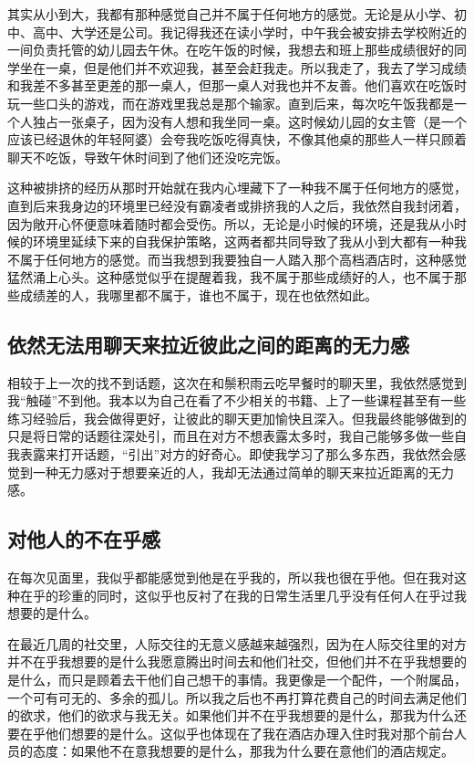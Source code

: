 其实从小到大，我都有那种感觉\pozhehao{}自己并不属于任何地方的感觉。无论是从小学、初中、高中、大学还是公司。我记得我还在读小学时，中午我会被安排去学校附近的一间负责托管的幼儿园去午休。在吃午饭的时候，我想去和班上那些成绩很好的同学坐在一桌，但是他们并不欢迎我，甚至会赶我走。所以我走了，我去了学习成绩和我差不多甚至更差的那一桌人，但那一桌人对我也并不友善。他们喜欢在吃饭时玩一些口头的游戏，而在游戏里我总是那个输家。直到后来，每次吃午饭我都是一个人独占一张桌子，因为没有人想和我坐同一桌。这时候幼儿园的女主管（是一个应该已经退休的年轻阿婆）会夸我吃饭吃得真快，不像其他桌的那些人一样只顾着聊天不吃饭，导致午休时间到了他们还没吃完饭。

这种被排挤的经历从那时开始就在我内心埋藏下了一种我不属于任何地方的感觉，直到后来我身边的环境里已经没有霸凌者或排挤我的人之后，我依然自我封闭着，因为敞开心怀便意味着随时都会受伤。所以，无论是小时候的环境，还是我从小时候的环境里延续下来的自我保护策略，这两者都共同导致了我从小到大都有一种我不属于任何地方的感觉。而当我想到我要独自一人踏入那个高档酒店时，这种感觉猛然涌上心头。这种感觉似乎在提醒着我，我不属于那些成绩好的人，也不属于那些成绩差的人，我哪里都不属于，谁也不属于，现在也依然如此。


\subsection*{依然无法用聊天来拉近彼此之间的距离的无力感}

相较于上一次的找不到话题，这次在和鬃积雨云吃早餐时的聊天里，我依然感觉到我“触碰”不到他。我本以为自己在看了不少相关的书籍、上了一些课程甚至有一些练习经验后，我会做得更好，让彼此的聊天更加愉快且深入。但我最终能够做到的只是将日常的话题往深处引，而且在对方不想表露太多时，我自己能够多做一些自我表露来打开话题，“引出”对方的好奇心。即使我学习了那么多东西，我依然会感觉到一种无力感\pozhehao{}对于想要亲近的人，我却无法通过简单的聊天来拉近距离的无力感。


\subsection*{对他人的不在乎感}

在每次见面里，我似乎都能感觉到他是在乎我的，所以我也很在乎他。但在我对这种在乎的珍重的同时，这似乎也反衬了在我的日常生活里几乎没有任何人在乎过我想要的是什么。

在最近几周的社交里，人际交往的无意义感越来越强烈，因为在人际交往里的对方并不在乎我想要的是什么\pozhehao{}我愿意腾出时间去和他们社交，但他们并不在乎我想要的是什么，而只是顾着去干他们自己想干的事情。我更像是一个配件，一个附属品，一个可有可无的、多余的孤儿。所以我之后也不再打算花费自己的时间去满足他们的欲求，他们的欲求与我无关。如果他们并不在乎我想要的是什么，那我为什么还要在乎他们想要的是什么。这似乎也体现在了我在酒店办理入住时我对那个前台人员的态度：如果他不在意我想要的是什么，那我为什么要在意他们的酒店规定。

